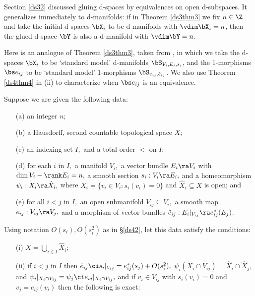 \documentclass{article}
\begin{document}
Section \ref{ds32} discussed gluing d-spaces by equivalences on open
d-subspaces. It generalizes immediately to d-manifolds: if in
Theorem \ref{ds3thm3} we fix $n\in\Z$ and take the initial d-spaces
$\bX_i$ to be d-manifolds with $\vdim\bX_i=n$, then the glued
d-space $\bY$ is also a d-manifold with $\vdim\bY=n$.

Here is an analogue of Theorem \ref{ds3thm3}, taken from \cite[\S
3.6]{Joyc6}, in which we take the d-spaces $\bX_i$ to be `standard
model' d-manifolds $\bS_{V_i,E_i,s_i}$, and the 1-morphisms $\bs
e_{ij}$ to be `standard model' 1-morphisms $\bS_{e_{ij},\hat
e_{ij}}$. We also use Theorem \ref{ds4thm4} in (ii) to characterize
when $\bs e_{ij}$ is an equivalence.

\begin{thm} Suppose we are given the following data:
\begin{itemize}
\setlength{\itemsep}{0pt}
\setlength{\parsep}{0pt}
\item[{\rm(a)}] an integer $n;$
\item[{\rm(b)}] a Hausdorff, second countable topological space $X;$
\item[{\rm(c)}] an indexing set\/ $I,$ and a total order $<$ on $I;$
\item[{\rm(d)}] for each\/ $i$ in $I,$ a manifold\/ $V_i,$ a vector
bundle $E_i\ra V_i$ with\/ $\dim V_i-\rank E_i=n,$ a smooth
section $s_i:V_i\ra E_i,$ and a homeomorphism $\psi_i:X_i\ra\hat
X_i,$ where $X_i=\{v_i\in V_i:s_i(v_i)=0\}$ and\/ $\hat
X_i\subseteq X$ is open; and
\item[{\rm(e)}] for all\/ $i<j$ in $I,$ an open submanifold
$V_{ij}\subseteq V_i,$ a smooth map $e_{ij}:V_{ij}\ra V_j,$ and
a morphism of vector bundles $\hat e_{ij}:E_i\vert_{V_{ij}}\ra
e_{ij}^*(E_j)$.
\end{itemize}
Using notation $O(s_i),O(s_i^2)$ as in\/ {\rm\S\ref{ds42},} let this
data satisfy the conditions:
\begin{itemize}
\setlength{\itemsep}{0pt}
\setlength{\parsep}{0pt}
\item[{\rm(i)}] $X=\bigcup_{i\in I}\hat X_i;$
\item[{\rm(ii)}] if\/ $i<j$ in $I$ then $\hat e_{ij}\ci
s_i\vert_{V_{ij}}= e_{ij}^*(s_j)+O(s_i^2),$ $\psi_i(X_i\cap
V_{ij})=\hat X_i\cap\hat X_j,$ and\/ $\psi_i\vert_{X_i\cap
V_{ij}}=\psi_j\ci e_{ij}\vert_{X_i\cap V_{ij}},$ and if\/
$v_i\in V_{ij}$ with\/ $s_i(v_i)=0$ and\/ $v_j=e_{ij}(v_i)$ then
the following is exact:
\begin{equation*}

\end{equation*}
\end{itemize}
\end{thm}
\end{document}
